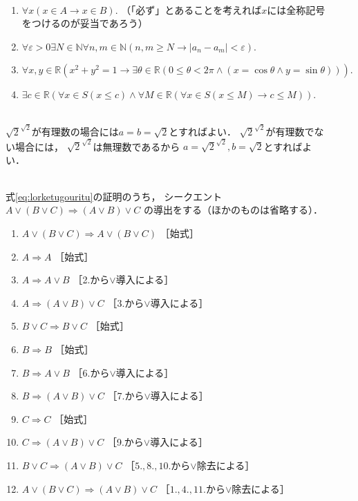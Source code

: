 \begin{description}
\item[] \mbox{} \\
  \begin{enumerate}
    \item $\forall x ( x \in A \to x \in B).$
      （「必ず」とあることを考えれば$x$には全称記号をつけるのが妥当であろう）
    \item $\forall \varepsilon >0 \exists N \in \mathbb{N} \forall n,m \in \mathbb{N}
      (n,m \geq N \to \lvert a_n - a_m \rvert < \varepsilon ).$
    \item $\forall x,y \in \mathbb{R} (x^2+y^2=1 \to \exists \theta \in \mathbb{R} 
      ( 0 \leq \theta <2 \pi \land (x= \cos \theta \land y= \sin \theta ))).$
    \item $\exists c \in \mathbb{R}(\forall x \in S ( x \leq c ) \land 
      \forall M \in \mathbb{R} (\forall x \in S (x \leq M) \to c \leq M)).$
  \end{enumerate}
\item[] \mbox{} \\  
  $\sqrt{2}^{\sqrt{2}}$が有理数の場合には$a = b= \sqrt{2}$とすればよい．
  $\sqrt{2}^{\sqrt{2}}$が有理数でない場合には，
  $\sqrt{2}^{\sqrt{2}}$は無理数であるから
  $a = \sqrt{2} ^{\sqrt{2}},  b= \sqrt{2}$とすればよい．

\item[] \mbox{} \\
  式\eqref{eq:lorketugouritu}の証明のうち，
  シークエント$A \lor ( B \lor C ) \Longrightarrow (A \lor B) \lor C$
  の導出をする（ほかのものは省略する）．
  \begin{enumerate}[1. ]
    \item $A \lor ( B \lor C) \Longrightarrow A \lor (B \lor C)$
           \quad ［始式］
    \item $A \Longrightarrow A$ \quad ［始式］
    \item $A \Longrightarrow A \lor B$ \quad ［2.から$\lor$導入による］
    \item $A \Longrightarrow (A \lor B ) \lor C$ \quad ［3.から$\lor$導入による］
    \item $B \lor C \Longrightarrow B \lor C$ \quad ［始式］
    \item $B \Longrightarrow B$ \quad ［始式］
    \item $B \Longrightarrow A \lor B$ \quad ［6.から$\lor$導入による］
    \item $B \Longrightarrow ( A \lor B) \lor C$ \quad ［7.から$\lor$導入による］
    \item $C \Longrightarrow C$ \quad ［始式］
    \item $C \Longrightarrow (A \lor B ) \lor C$ \quad ［9.から$\lor$導入による］
    \item $B \lor C \Longrightarrow (A \lor B ) \lor C$
           \quad ［$5., 8., 10.$から$\lor$除去による］
    \item $A \lor ( B \lor C) \Longrightarrow (A \lor B ) \lor C$
           \quad ［$1., 4., 11.$から$\lor$除去による］
  \end{enumerate}


\end{description}
